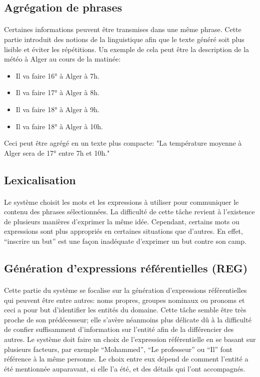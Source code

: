	\subsection{Agrégation de phrases}
	\paragraph{}
	Certaines informations peuvent être transmises dans une même phrase. Cette partie introduit des notions de la linguistique afin que le texte généré soit plus lisible et éviter les répétitions. Un exemple de cela peut être la description de la météo à Alger au cours de la matinée:
	\begin{itemize}
		\item Il va faire 16° à Alger à 7h.
		\item Il va faire 17° à Alger à 8h.
		\item Il va faire 18° à Alger à 9h.
		\item Il va faire 18° à Alger à 10h.
	\end{itemize}
	Ceci peut être agrégé en un texte plus compacte: "La température moyenne à Alger sera de 17° entre 7h et 10h."
	
	\subsection{Lexicalisation}
	\paragraph{}Le système choisit les mots et les expressions à utiliser pour communiquer le contenu des phrases sélectionnées. La difficulté de cette tâche revient à l’existence de plusieurs manières d’exprimer la même idée. Cependant, certains mots ou expressions sont plus appropriés en certaines situations que d’autres. En effet, “inscrire un but” est une façon inadéquate d’exprimer un but contre son camp\cite{Gatt2018}.
	
	\subsection{Génération d’expressions référentielles (REG)}
	\paragraph{}Cette partie du système se focalise sur la génération d’expressions référentielles qui peuvent être entre autres: noms propres, groupes nominaux ou pronoms et ceci a pour but d’identifier les entités du domaine. Cette tâche semble être très proche de son prédécesseur; elle s’avère néanmoins plus délicate dû à la difficulté de confier suffisamment d’information sur l’entité afin de la différencier des autres\cite{Reiter:1997}. Le système doit faire un choix de l’expression référentielle en se basant sur plusieurs facteurs, par exemple “Mohammed”, “Le professeur” ou “Il” font référence à la même personne. Le choix entre eux dépend de comment l’entité a été mentionnée auparavant, si elle l'a été, et des détails qui l'ont accompagnés. 
	
